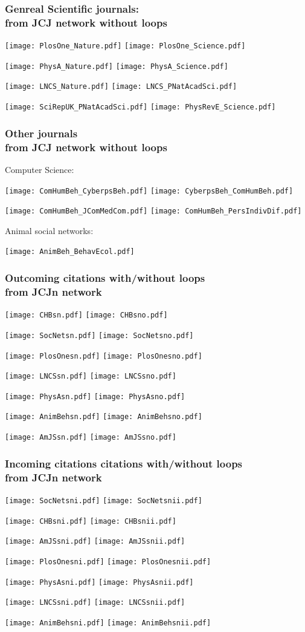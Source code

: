 \documentclass[hyperref={pdfstartview={FitBH -32768},
                         pdfpagemode=FullScreen,
                         plainpages=false,
                         colorlinks=true}
              ]{beamer}
\begin{document}
\begin{frame}[fragile]
\frametitle{Genreal Scientific journals: \\ \normalsize from JCJ network without loops} 
\centerline{
\texttt{[image: PlosOne\_Nature.pdf]} 
\texttt{[image: PlosOne\_Science.pdf]}}
\centerline{
\texttt{[image: PhysA\_Nature.pdf]}
\texttt{[image: PhysA\_Science.pdf]}}
\centerline{
\texttt{[image: LNCS\_Nature.pdf]} 
\texttt{[image: LNCS\_PNatAcadSci.pdf]}} 
\centerline{
\texttt{[image: SciRepUK\_PNatAcadSci.pdf]}
\texttt{[image: PhysRevE\_Science.pdf]}} 

\end{frame}   

\begin{frame}[fragile]
\frametitle{Other journals \\ \normalsize from JCJ network without loops} 

Computer Science: \smallskip

\centerline{
\texttt{[image: ComHumBeh\_CyberpsBeh.pdf]} 
\texttt{[image: CyberpsBeh\_ComHumBeh.pdf]}} 
\centerline{
\texttt{[image: ComHumBeh\_JComMedCom.pdf]} 
\texttt{[image: ComHumBeh\_PersIndivDif.pdf]}}

Animal social networks:  \smallskip

\centerline{
\texttt{[image: AnimBeh\_BehavEcol.pdf]}} 
\end{frame}   


\begin{frame}[fragile]
\frametitle{Outcoming citations with/without loops \\ \normalsize from JCJn network} 
\centerline{
\texttt{[image: CHBsn.pdf]} 
\texttt{[image: CHBsno.pdf]}} 
\centerline{
\texttt{[image: SocNetsn.pdf]}
\texttt{[image: SocNetsno.pdf]}} 
\centerline{
\texttt{[image: PlosOnesn.pdf]} 
\texttt{[image: PlosOnesno.pdf]}} 
\centerline{
\texttt{[image: LNCSsn.pdf]} 
\texttt{[image: LNCSsno.pdf]}} 
\centerline{
\texttt{[image: PhysAsn.pdf]} 
\texttt{[image: PhysAsno.pdf]}}
\centerline{
\texttt{[image: AnimBehsn.pdf]} 
\texttt{[image: AnimBehsno.pdf]}} 
\centerline{
\texttt{[image: AmJSsn.pdf]} 
\texttt{[image: AmJSsno.pdf]}}
\end{frame}   

\begin{frame}[fragile]
\frametitle{Incoming citations citations with/without loops \\ \normalsize from JCJn network} 
\centerline{
\texttt{[image: SocNetsni.pdf]} 
\texttt{[image: SocNetsnii.pdf]}}
\centerline{
\texttt{[image: CHBsni.pdf]} 
\texttt{[image: CHBsnii.pdf]}} 
\centerline{
\texttt{[image: AmJSsni.pdf]} 
\texttt{[image: AmJSsnii.pdf]}}
\centerline{
\texttt{[image: PlosOnesni.pdf]} 
\texttt{[image: PlosOnesnii.pdf]}} 
\centerline{
\texttt{[image: PhysAsni.pdf]} 
\texttt{[image: PhysAsnii.pdf]}}
\centerline{
\texttt{[image: LNCSsni.pdf]} 
\texttt{[image: LNCSsnii.pdf]}} 
\centerline{
\texttt{[image: AnimBehsni.pdf]}
\texttt{[image: AnimBehsnii.pdf]}} 
\end{frame}   
\end{document}
